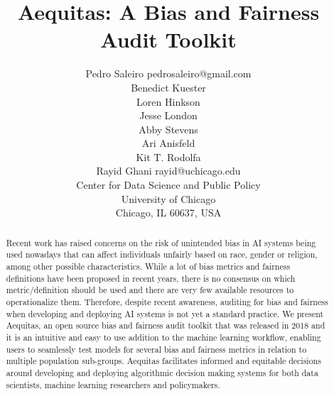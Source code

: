 \documentclass[twoside,11pt]{article}
\begin{document}
\title{Aequitas: A Bias and Fairness Audit Toolkit}

\author{\name Pedro Saleiro \email pedrosaleiro@gmail.com \\
       \name Benedict Kuester  \\
       \name Loren Hinkson  \\
       \name Jesse London  \\
       \name Abby Stevens  \\
       \name Ari Anisfeld  \\
       \name Kit T. Rodolfa  \\
       \name Rayid Ghani \email rayid@uchicago.edu \\
       \addr Center for Data Science and Public Policy\\
       University of Chicago\\
       Chicago, IL 60637, USA}

\editor{}

\maketitle

\begin{abstract}

Recent work has raised concerns on the risk of unintended bias in AI systems being used nowadays that can affect individuals unfairly based on race, gender or religion, among other possible characteristics. While a lot of bias metrics and fairness definitions have been proposed in recent years, there is no consensus on which metric/definition should be used and there are very few available resources to operationalize them. Therefore, despite recent awareness, auditing for bias and fairness when developing and deploying AI systems is not yet a standard practice. We present Aequitas, an open source bias and fairness audit toolkit that was released in 2018 and it is an intuitive and easy to use addition to the machine learning workflow, enabling users to seamlessly test models for several bias and fairness metrics in relation to multiple population sub-groups. Aequitas facilitates informed and equitable decisions around developing and deploying algorithmic decision making systems for both data scientists, machine learning researchers and policymakers.

\end{abstract}









\newpage

\end{document}
